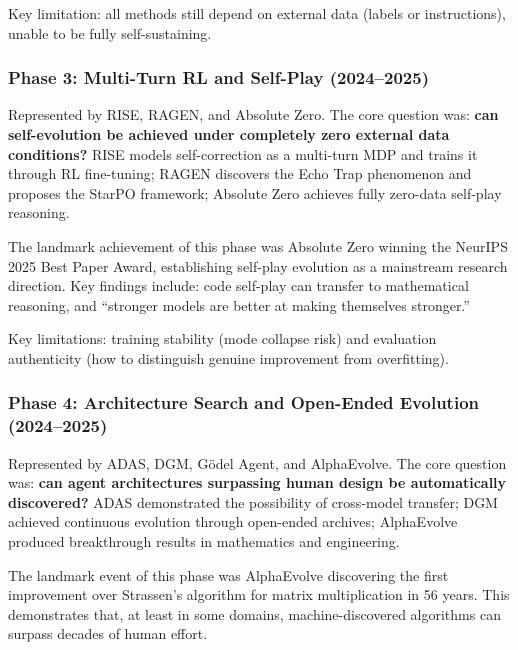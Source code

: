 Key limitation: all methods still depend on external data (labels or instructions), unable to be fully self-sustaining.

\subsubsection{Phase 3: Multi-Turn RL and Self-Play (2024--2025)}

Represented by RISE, RAGEN, and Absolute Zero. The core question was: \textbf{can self-evolution be achieved under completely zero external data conditions?} RISE models self-correction as a multi-turn MDP and trains it through RL fine-tuning; RAGEN discovers the Echo Trap phenomenon and proposes the StarPO framework; Absolute Zero achieves fully zero-data self-play reasoning.

The landmark achievement of this phase was Absolute Zero winning the NeurIPS 2025 Best Paper Award, establishing self-play evolution as a mainstream research direction. Key findings include: code self-play can transfer to mathematical reasoning, and ``stronger models are better at making themselves stronger.''

Key limitations: training stability (mode collapse risk) and evaluation authenticity (how to distinguish genuine improvement from overfitting).

\subsubsection{Phase 4: Architecture Search and Open-Ended Evolution (2024--2025)}

Represented by ADAS, DGM, G\"{o}del Agent, and AlphaEvolve. The core question was: \textbf{can agent architectures surpassing human design be automatically discovered?} ADAS demonstrated the possibility of cross-model transfer; DGM achieved continuous evolution through open-ended archives; AlphaEvolve produced breakthrough results in mathematics and engineering.

The landmark event of this phase was AlphaEvolve discovering the first improvement over Strassen's algorithm for matrix multiplication in 56 years. This demonstrates that, at least in some domains, machine-discovered algorithms can surpass decades of human effort.

